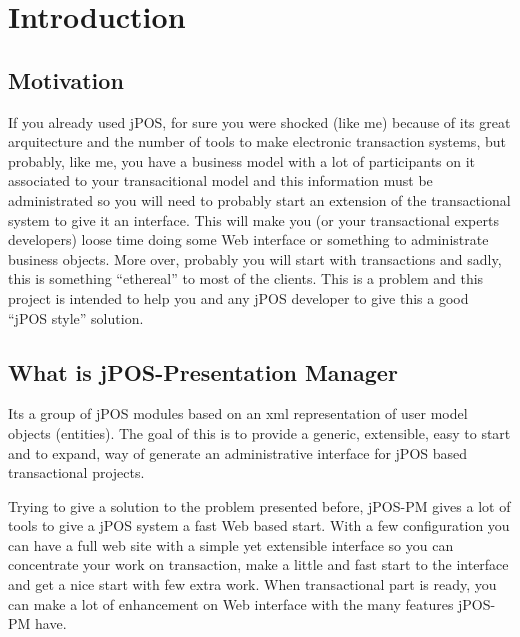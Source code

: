 





\pagestyle{plain}

\tableofcontents

\clearpage

\section{Introduction}


\subsection{Motivation}

If you already used jPOS, for sure you were shocked (like me) because of its
great arquitecture and the number of tools to make electronic transaction
systems, but probably, like me, you have a business model with a lot of
participants on it associated to your transacitional model and this information
must be administrated so you will need to probably start an extension of the
transactional system to give it an interface. This will make you (or your
transactional experts developers) loose time doing some Web interface or
something to administrate business objects. More over, probably you will start
with transactions and sadly, this is something ``ethereal'' to most of the
clients. This is a problem and this project is intended to help you and any
jPOS developer to give this a good ``jPOS style'' solution.

\subsection{What is jPOS-Presentation Manager}

Its a group of jPOS modules based on an xml representation of user model
objects (entities). The goal of this is to provide a generic, extensible, easy
to start and to expand, way of generate an administrative interface for jPOS
based transactional projects.

Trying to give a solution to the problem presented before, jPOS-PM gives a lot
of tools to give a jPOS system a fast Web based start. With a few configuration
you can have a full web site with a simple yet extensible interface so you can
concentrate your work on transaction, make a little and fast start to the
interface and get a nice start with few extra work. When transactional part is
ready, you can make a lot of enhancement on Web interface with the many
features jPOS-PM have.

